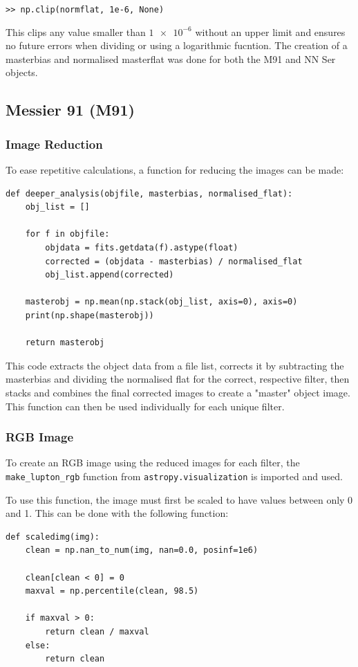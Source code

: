 \documentclass[11pt, a4paper, twocolumn]{article}
\begin{document}
\;\verb|>> np.clip(normflat, 1e-6, None)|

This clips any value smaller than $\num{1e-6}$ without an upper limit and ensures no future errors when dividing or using a logarithmic fucntion. The creation of a masterbias and normalised masterflat was done for both the M91 and NN Ser objects.

\subsection{Messier 91 (M91)}
\subsubsection{Image Reduction} \label{sec:2.1.1}

To ease repetitive calculations, a function for reducing the images can be made:

\begin{lstlisting}
def deeper_analysis(objfile, masterbias, normalised_flat):
    obj_list = []
    
    for f in objfile:
        objdata = fits.getdata(f).astype(float)
        corrected = (objdata - masterbias) / normalised_flat
        obj_list.append(corrected)

    masterobj = np.mean(np.stack(obj_list, axis=0), axis=0)
    print(np.shape(masterobj))

    return masterobj
\end{lstlisting}

This code extracts the object data from a file list, corrects it by subtracting the masterbias and dividing the normalised flat for the correct, respective filter, then stacks and combines the final corrected images to create a "master" object image. This function can then be used individually for each unique filter.

\subsubsection{RGB Image}

To create an RGB image using the reduced images for each filter, the \verb|make_lupton_rgb| function from \verb|astropy.visualization| is imported and used.

To use this function, the image must first be scaled to have values between only 0 and 1. This can be done with the following function:

\begin{lstlisting}
def scaledimg(img):
    clean = np.nan_to_num(img, nan=0.0, posinf=1e6)

    clean[clean < 0] = 0
    maxval = np.percentile(clean, 98.5)

    if maxval > 0:
        return clean / maxval
    else:
        return clean
\end{lstlisting}
\end{document}
